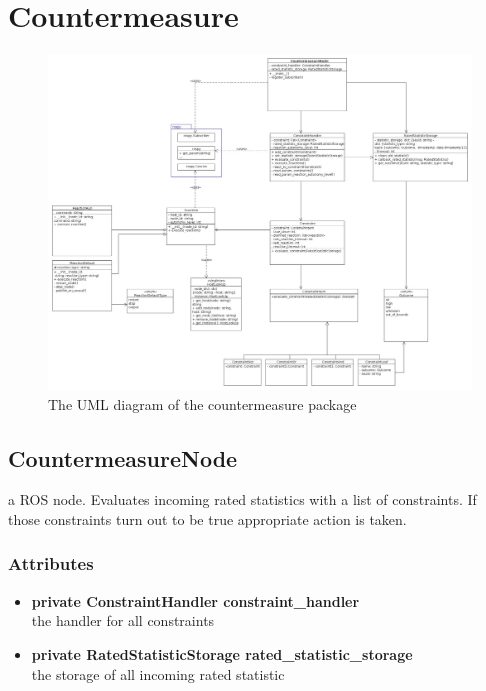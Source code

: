\newpage
\section{Countermeasure}
\begin{figure}[!ht]
\begin{center}
\includegraphics[width=1.0\linewidth]{./diagram_pictures/reactor/reactor.jpg}
\caption{The UML diagram of the countermeasure package}
\end{center}
\end{figure}

\mbox{}

\newpage


\subsection{CountermeasureNode}
a ROS node. Evaluates incoming rated statistics with a list of constraints. If those constraints turn out to be true appropriate action is taken.
\subsubsection{Attributes}
\begin{itemize}
	\item \textbf{ private ConstraintHandler constraint\_handler}\\
		the handler for all constraints
	\item \textbf{ private RatedStatisticStorage rated\_statistic\_storage}\\
		the storage of all incoming rated statistic
\end{itemize}
